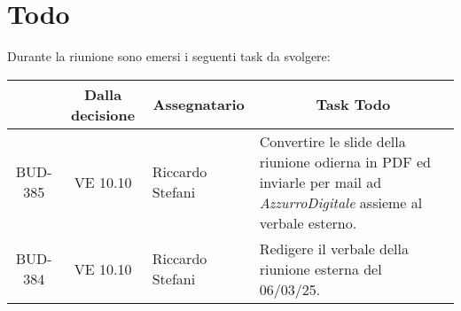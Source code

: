

\section{Todo}

Durante la riunione sono emersi i seguenti task da svolgere:

\vspace{0.5cm}

\begin{table}[htbp]
\centering
{}
\begin{tabular}{|c|c|p{}|p{}|}
    \hline
    \rowcolor[gray]{0.75}
    \multicolumn{1}{|c|}{\textbf{Codice}} & \multicolumn{1}{|c|}{\textbf{Dalla decisione}} & \multicolumn{1}{|c|}{\textbf{Assegnatario}} & \multicolumn{1}{|c|}{\textbf{Task Todo}} \\
    \hline
    BUD-385 & VE 10.10 & Riccardo Stefani & Convertire le slide della riunione odierna in PDF ed inviarle per mail ad
    \emph{AzzurroDigitale} assieme al verbale esterno.\\
    \hline
    BUD-384 & VE 10.10 & Riccardo Stefani & Redigere il verbale della riunione esterna del 06/03/25.\\
    \hline
\end{tabular}
\end{table}


